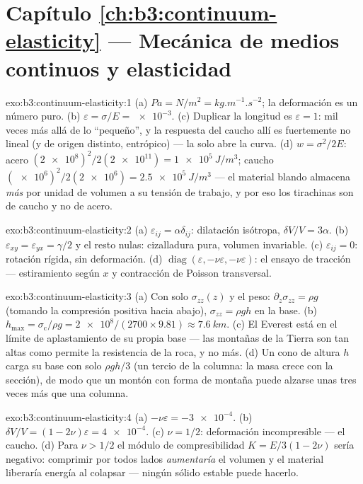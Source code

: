\section*{Capítulo \ref{ch:b3:continuum-elasticity} --- Mecánica de medios continuos y elasticidad}

\begin{solution}{exo:b3:continuum-elasticity:1}
(a) $\unit{Pa} = \unit{N/m^2} = \unit{kg.m^{-1}.s^{-2}}$; la deformación es
un número puro. (b) $\varepsilon = \sigma/E = \num{e-3}$. (c) Duplicar
la longitud es $\varepsilon = 1$: mil veces más allá de lo ``pequeño'',
y la respuesta del caucho allí es fuertemente no lineal (y de origen
distinto, entrópico) --- la  solo abre la curva. (d) $w =
\sigma^2/2E$: acero $(\num{2e8})^2/2(\num{2e11}) =
\qty{1e5}{J/m^3}$; caucho $(\num{e6})^2/2(\num{2e6}) =
\qty{2.5e5}{J/m^3}$ --- el material blando almacena \emph{más} por unidad
de volumen a su tensión de trabajo, y por eso los tirachinas son de caucho
y no de acero.
\end{solution}

\begin{solution}{exo:b3:continuum-elasticity:2}
(a) $\varepsilon_{ij} = \alpha\delta_{ij}$: dilatación isótropa,
$\delta V/V = 3\alpha$. (b) $\varepsilon_{xy} = \varepsilon_{yx} =
\gamma/2$ y el resto nulas: cizalladura pura, volumen invariable. (c)
$\varepsilon_{ij} = 0$: rotación rígida, sin deformación. (d)
$\operatorname{diag}(\varepsilon, -\nu\varepsilon, -\nu\varepsilon)$:
el ensayo de tracción --- estiramiento según $x$ y contracción de Poisson
transversal.
\end{solution}

\begin{solution}{exo:b3:continuum-elasticity:3}
(a) Con solo $\sigma_{zz}(z)$ y el peso: $\partial_z\sigma_{zz} =
\rho g$ (tomando la compresión positiva hacia abajo), $\sigma_{zz} = \rho
gh$ en la base. (b) $h_{\max} = \sigma_{\text{c}}/\rho g =
\num{2e8}/(2700 \times 9.81) \approx \qty{7.6}{km}$. (c) El Everest está en
el límite de aplastamiento de su propia base --- las montañas de la Tierra
son tan altas como permite la resistencia de la roca, y no más. (d) Un cono
de altura $h$ carga su base con solo $\rho gh/3$ (un tercio de la columna:
la masa crece con la sección), de modo que un montón con forma de montaña
puede alzarse unas tres veces más que una columna.
\end{solution}

\begin{solution}{exo:b3:continuum-elasticity:4}
(a) $-\nu\varepsilon = \num{-3e-4}$. (b) $\delta V/V = (1 -
2\nu)\varepsilon = \num{4e-4}$. (c) $\nu = 1/2$: deformación
incompresible --- el caucho. (d) Para $\nu > 1/2$ el módulo de
compresibilidad $K =
E/3(1 - 2\nu)$ sería negativo: comprimir por todos lados \emph{aumentaría} el volumen y el material liberaría energía al
colapsar --- ningún sólido estable puede hacerlo.
\end{solution}

